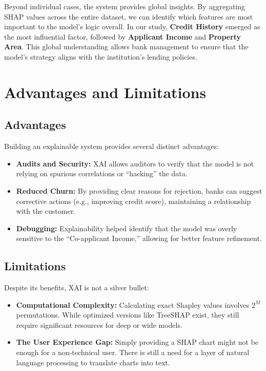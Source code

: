\documentclass[12pt, a4paper]{article}
\begin{document}
Beyond individual cases, the system provides global insights. By aggregating SHAP values across the entire dataset, we can identify which features are most important to the model's logic overall. In our study, \textbf{Credit History} emerged as the most influential factor, followed by \textbf{Applicant Income} and \textbf{Property Area}. This global understanding allows bank management to ensure that the model's strategy aligns with the institution's lending policies.

\section{Advantages and Limitations}

\subsection{Advantages}

Building an explainable system provides several distinct advantages:
\begin{itemize}
    \item \textbf{Audits and Security:} XAI allows auditors to verify that the model is not relying on spurious correlations or ``hacking'' the data.
    \item \textbf{Reduced Churn:} By providing clear reasons for rejection, banks can suggest corrective actions (e.g., improving credit score), maintaining a relationship with the customer.
    \item \textbf{Debugging:} Explainability helped identify that the model was overly sensitive to the ``Co-applicant Income,'' allowing for better feature refinement.
\end{itemize}

\subsection{Limitations}

Despite its benefits, XAI is not a silver bullet:
\begin{itemize}
    \item \textbf{Computational Complexity:} Calculating exact Shapley values involves $2^M$ permutations. While optimized versions like TreeSHAP exist, they still require significant resources for deep or wide models.
    \item \textbf{The User Experience Gap:} Simply providing a SHAP chart might not be enough for a non-technical user. There is still a need for a layer of natural language processing to translate charts into text.
\end{itemize}
\end{document}
